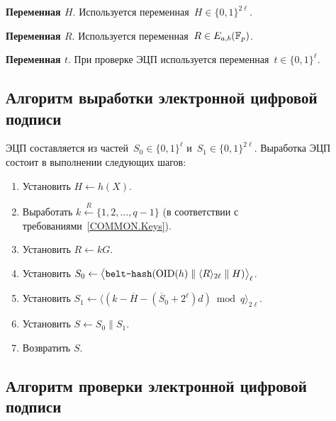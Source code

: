 {\bf Переменная $H$}.
Используется переменная~$H\in\{0,1\}^{2\ell}$.

{\bf Переменная $R$}.
Используется переменная~$R\in E_{a,b}(\mathbb{F}_p)$.

{\bf Переменная $t$}.
При проверке ЭЦП используется переменная~$t\in\{0,1\}^\ell$.

\subsection{Алгоритм выработки электронной цифровой подписи}
\label{SIGN.Sign}

ЭЦП составляется из частей~$S_0\in\{0,1\}^\ell$ и~$S_1\in\{0,1\}^{2\ell}$. 
Выработка ЭЦП состоит в выполнении следующих шагов:
\begin{enumerate}
\item
Установить $H\leftarrow h(X)$.

\item
Выработать
$k\stackrel{R}{\leftarrow}\{1,2,\ldots,q-1\}$
(в соответствии с требованиями~\ref{COMMON.Keys}).

\item
Установить $R\leftarrow kG$.

\item
Установить
$S_0\leftarrow 
\bigl\langle
\texttt{belt-hash}
(\text{\normalfont OID}(h)\parallel\langle R\rangle_{2\ell}\parallel H)
\bigr\rangle_\ell$.

\item
Установить
$S_1\leftarrow\bigl\langle(k-\overline{H}-(\overline{S}_0+2^\ell)d)\bmod q
\bigr\rangle_{2\ell}$.

\item
Установить $S\leftarrow S_0\parallel S_1$.

\item
Возвратить $S$.
\end{enumerate}

\subsection{Алгоритм проверки электронной цифровой подписи}
\label{SIGN.Verify}

